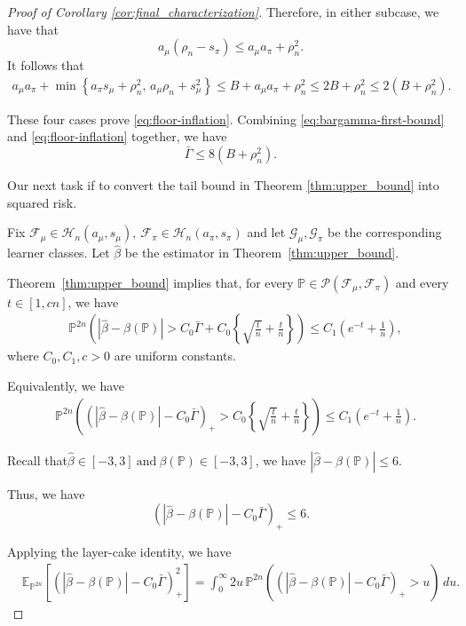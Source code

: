 \documentclass[11pt]{article}
\begin{document}
\begin{proof}[Proof of Corollary \ref{cor:final_characterization}]
Therefore, in either subcase, we have that
\[
a_\mu(\rho_n-s_\pi)
\le
a_\mu a_\pi+\rho_n^2.
\]
It follows that
\begin{align*}
a_\mu a_\pi+
\min\left\{
a_\pi s_\mu+\rho_n^2,\,
a_\mu\rho_n+s_\mu^2
\right\}
\le
B+a_\mu a_\pi+\rho_n^2
\le
2B+\rho_n^2
\le
2(B+\rho_n^2).
\end{align*}

These four cases prove \eqref{eq:floor-inflation}. Combining
\eqref{eq:bargamma-first-bound} and \eqref{eq:floor-inflation} together, we have
\[
\bar\Gamma
\le
8(B+\rho_n^2).
\]

Our next task if to convert the tail bound in Theorem \ref{thm:upper_bound} into squared risk.

Fix $ \mathcal F_\mu\in\mathcal H_n(a_\mu,s_\mu),\ \mathcal F_\pi\in\mathcal H_n(a_\pi,s_\pi)$ and let \(\mathcal G_\mu,\mathcal G_\pi\) be the corresponding
learner classes. Let \(\widehat\beta\) be the  estimator in
Theorem~\ref{thm:upper_bound}.

Theorem~\ref{thm:upper_bound} implies that, for every $\mathbb P\in\mathcal P(\mathcal F_\mu,\mathcal F_\pi)$ and every \(t\in[1,cn]\), we have
\begin{align}
&\mathbb P^{2n}\left(
\left|
\widehat\beta-\beta(\mathbb P)
\right|
>
C_0\bar\Gamma+
C_0\left\{
\sqrt{\frac tn}+\frac tn
\right\}
\right)\le
C_1\left(e^{-t}+\frac1n\right),
\label{eq:tail-for-integration}
\end{align}
where \(C_0,C_1,c>0\) are uniform constants.

Equivalently, we have
\begin{align}
&\mathbb P^{2n}\left(
\left(
\left|
\widehat\beta-\beta(\mathbb P)
\right|
-C_0\bar\Gamma
\right)_+
>
C_0\left\{
\sqrt{\frac tn}+\frac tn
\right\}
\right)\le
C_1\left(e^{-t}+\frac1n\right).
\label{eq:positive-part-tail}
\end{align}

Recall that$
\widehat\beta\in[-3,3]
\ \text{and}\ 
\beta(\mathbb P)\in[-3,3]$, we have $\left|
\widehat\beta-\beta(\mathbb P)
\right|
\le6$.

Thus, we have
\[
\left(
\left|
\widehat\beta-\beta(\mathbb P)
\right|
-C_0\bar\Gamma
\right)_+
\le6.
\]

Applying the layer-cake identity, we have
\begin{align*}
&\mathbb E_{\mathbb P^{2n}}
\left[
\left(
\left|
\widehat\beta-\beta(\mathbb P)
\right|
-C_0\bar\Gamma
\right)_+^2
\right]=
\int_0^\infty
2u\,
\mathbb P^{2n}\left(
\left(
\left|
\widehat\beta-\beta(\mathbb P)
\right|
-C_0\bar\Gamma
\right)_+
>u
\right)\,du.
\end{align*}


\end{proof}
\end{document}
